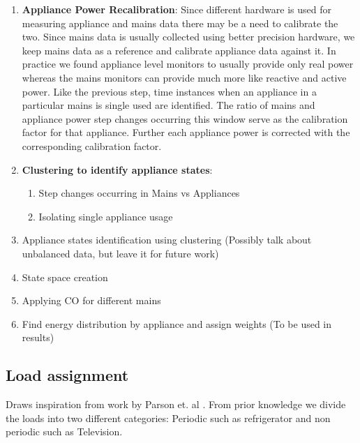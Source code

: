\documentclass[conference]{IEEEtran}
\begin{document}
\begin{enumerate}
\item \textbf{Appliance Power Recalibration}: Since different hardware is used for measuring appliance and mains data there may be a need to calibrate the two. Since mains data is usually collected using better precision hardware, we keep mains data as a reference and calibrate appliance data against it. In practice we found appliance level monitors to usually provide only real power whereas the mains monitors can provide much more like reactive and active power. Like the previous step, time instances when an appliance in a particular mains is single used are identified. The ratio of mains and appliance power step changes occurring this window serve as the calibration factor for that appliance. Further each appliance power is corrected with the corresponding calibration factor.

\item \textbf{Clustering to identify appliance states}:
\begin{enumerate}
\item Step changes occurring in Mains vs Appliances
\item Isolating single appliance usage
\end{enumerate}
\item Appliance states identification using clustering (Possibly talk about unbalanced data, but leave it for future work)
\item State space creation
\item Applying CO for different mains
\item Find energy distribution by appliance and assign weights (To be used in results)

\end{enumerate}






\subsection{Load assignment}
Draws inspiration from work by Parson et. al \cite{parson2012_aaai}. From prior knowledge we divide the loads into two different categories: Periodic such as refrigerator and non periodic such as Television.
\end{document}
